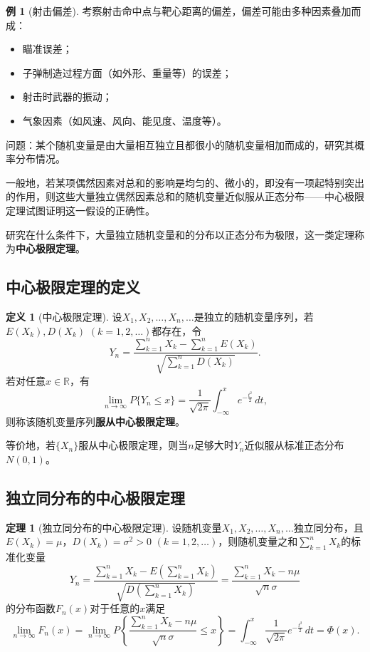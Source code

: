 \documentclass[11pt,a4paper]{report}
\theoremstyle{definition}
\newtheorem{definition}{定义}[chapter]
\newtheorem{example}{例}[chapter]
\newtheorem{theorem}{定理}[chapter]
\begin{document}
\begin{example}[射击偏差]
考察射击命中点与靶心距离的偏差，偏差可能由多种因素叠加而成：
\begin{itemize}[leftmargin=2em]
    \item 瞄准误差；
    \item 子弹制造过程方面（如外形、重量等）的误差；
    \item 射击时武器的振动；
    \item 气象因素（如风速、风向、能见度、温度等）。
\end{itemize}
\end{example}

问题：某个随机变量是由大量相互独立且都很小的随机变量相加而成的，研究其概率分布情况。

一般地，若某项偶然因素对总和的影响是均匀的、微小的，即没有一项起特别突出的作用，则这些大量独立偶然因素总和的随机变量近似服从正态分布——中心极限定理试图证明这一假设的正确性。

研究在什么条件下，大量独立随机变量和的分布以正态分布为极限，这一类定理称为\textbf{中心极限定理}。

\subsection{中心极限定理的定义}

\begin{definition}[中心极限定理]
设$X_{1},X_{2},\ldots,X_{n},\ldots$是独立的随机变量序列，若$E(X_{k}),D(X_{k})$ $(k=1,2,\ldots)$都存在，令
\[
Y_{n}=\frac{\sum_{k=1}^{n}X_{k}-\sum_{k=1}^{n}E(X_{k})}{\sqrt{\sum_{k=1}^{n}D(X_{k})}}.
\]
若对任意$x\in\mathbb{R}$，有
\[
\lim_{n\to\infty}P\{Y_{n}\leq x\}=\frac{1}{\sqrt{2\pi}}\int_{-\infty}^{x}e^{-\frac{t^{2}}{2}}\,dt,
\]
则称该随机变量序列\textbf{服从中心极限定理}。

等价地，若$\{X_{n}\}$服从中心极限定理，则当$n$足够大时$Y_{n}$近似服从标准正态分布$N(0,1)$。
\end{definition}

\subsection{独立同分布的中心极限定理}

\begin{theorem}[独立同分布的中心极限定理]
设随机变量$X_{1},X_{2},\ldots,X_{n},\ldots$独立同分布，且$E(X_{k})=\mu$，$D(X_{k})=\sigma^{2}>0$ $(k=1,2,\ldots)$，则随机变量之和$\sum_{k=1}^{n}X_{k}$的标准化变量
\[
Y_{n}=\frac{\sum_{k=1}^{n}X_{k}-E\left(\sum_{k=1}^{n}X_{k}\right)}{\sqrt{D\left(\sum_{k=1}^{n}X_{k}\right)}}=\frac{\sum_{k=1}^{n}X_{k}-n\mu}{\sqrt{n}\sigma}
\]
的分布函数$F_{n}(x)$对于任意的$x$满足
\[
\lim_{n\to\infty}F_{n}(x)=\lim_{n\to\infty}P\left\{\frac{\sum_{k=1}^{n}X_{k}-n\mu}{\sqrt{n}\sigma}\leq x\right\}=\int_{-\infty}^{x}\frac{1}{\sqrt{2\pi}}e^{-\frac{t^{2}}{2}}\,dt=\Phi(x).
\]
\end{theorem}
\end{document}
